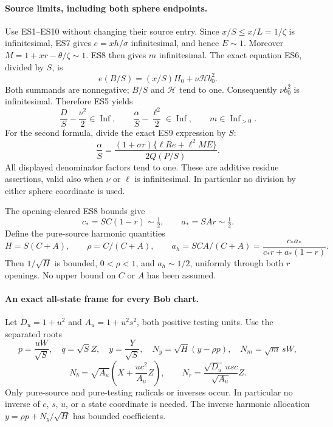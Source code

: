 \paragraph{Source limits, including both sphere endpoints.}
Use ES1--ES10 without changing their source entry. Since
$x/S\le x/L=1/\zeta$ is infinitesimal, ES7 gives
$e=xh/\sigma$ infinitesimal, and hence $E\sim1$.
Moreover $M=1+xr-\theta/\zeta\sim1$. ES8 then gives $m$ infinitesimal.
The exact equation ES6, divided by $S$, is
\[
 e(B/S)=(x/S)H_0+\nu\mathcal H b_0^2.
\]
Both summands are nonnegative; $B/S$ and $\mathcal H$ tend to one.
Consequently $\nu b_0^2$ is infinitesimal. Therefore ES5 yields
\[
 \frac DS-\frac{\nu^2}{2}\in\operatorname{Inf},\qquad
 \frac\alpha S-\frac{\ell^2}{2}\in\operatorname{Inf},
 \qquad m\in\operatorname{Inf}_{>0}.                         \tag{EB2}
\]
For the second formula, divide the exact ES9 expression by $S$:
\[
 \frac\alpha S=
 \frac{(1+\sigma r)\{\ell R e+\ell^2ME\}}
 {2Q(P/S)}.
\]
All displayed denominator factors tend to one. These are additive
residue assertions, valid also when $\nu$ or $\ell$ is infinitesimal.
In particular no division by either sphere coordinate is used.

The opening-cleared ES8 bounds give
\[
 c_*=SC(1-r)\sim\tfrac12,\qquad
 a_*=SAr\sim\tfrac12.
\]
Define the pure-source harmonic quantities
\[
 H=S(C+A),\qquad \rho=C/(C+A),\qquad
 a_h=SCA/(C+A)=\frac{c_*a_*}{c_*r+a_*(1-r)}.
                                                               \tag{EB3}
\]
Then $1/\sqrt H$ is bounded, $0<\rho<1$, and $a_h\sim1/2$,
uniformly through both $r$ openings. No upper bound on $C$ or $A$
has been assumed.

\paragraph{An exact all-state frame for every Bob chart.}
Let $D_u=1+u^2$ and $A_u=1+u^2s^2$, both positive testing units.
Use the separated roots
\[
 p=\frac{uW}{\sqrt S},\quad q=\sqrt S Z,\quad
 y=\frac Y{\sqrt S},\quad N_y=\sqrt H(y-\rho p),
 \quad N_m=\sqrt m\,sW,
\]
\[
 N_b=\sqrt{A_u}\left(X+\frac{uc^2}{A_u}Z\right),
 \qquad N_r=\frac{\sqrt{D_u}\,usc}{\sqrt{A_u}}Z.
                                                               \tag{EB4}
\]
Only pure-source and pure-testing radicals or inverses occur.
In particular no inverse of $c$, $s$, $u$, or a state coordinate is
needed. The inverse harmonic allocation
$y=\rho p+N_y/\sqrt H$ has bounded coefficients.

